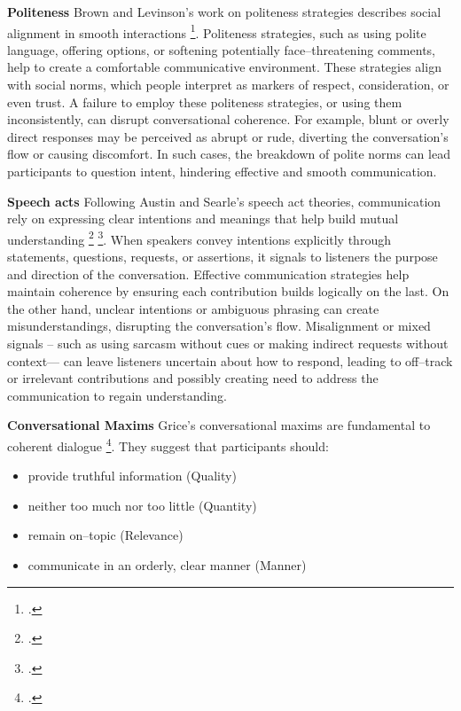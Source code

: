 \documentclass[12pt]{report}
\begin{document}
\par{\textbf{Politeness}
Brown and Levinson’s work on politeness strategies describes social alignment in smooth interactions \footcite{brown1987politeness}. Politeness strategies, such as using polite language, offering options, or softening potentially face–threatening comments, help to create a comfortable communicative environment. These strategies align with social norms, which people interpret as markers of respect, consideration, or even trust. A failure to employ these politeness strategies, or using them inconsistently, can disrupt conversational coherence. For example, blunt or overly direct responses may be perceived as abrupt or rude, diverting the conversation's flow or causing discomfort. In such cases, the breakdown of polite norms can lead participants to question intent, hindering effective and smooth communication.


\par{\textbf{Speech acts}}
Following Austin and Searle's speech act theories, communication rely on expressing clear intentions and meanings that help build mutual understanding \footcite{austin1962how} \footcite{searle1969speech}. When speakers convey intentions explicitly through statements, questions, requests, or assertions, it signals to listeners the purpose and direction of the conversation. Effective communication strategies help maintain coherence by ensuring each contribution builds logically on the last. On the other hand, unclear intentions or ambiguous phrasing can create misunderstandings, disrupting the conversation's flow. Misalignment or mixed signals – such as using sarcasm without cues or making indirect requests without context— can leave listeners uncertain about how to respond, leading to off–track or irrelevant contributions and possibly creating need to address the communication to regain understanding.

\par{\textbf{Conversational Maxims}}
Grice’s conversational maxims are fundamental to coherent dialogue \footcite{grice1975logic}.
They suggest that participants should:

\begin{itemize}
\item
provide truthful information (Quality)
\item
neither too much nor too little (Quantity)
\item
remain on–topic (Relevance)
\item
communicate in an orderly, clear manner (Manner)
\end{itemize}

}
\end{document}
